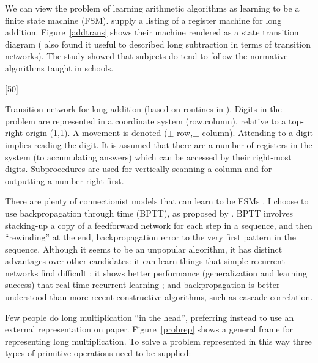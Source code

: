 
We can view the problem of learning arithmetic algorithms as
learning to be a finite state machine (FSM).
 supply a listing of a register machine for long addition.
Figure~\ref{addtrans} shows their machine rendered as a state transition
diagram (
also found it useful to described long subtraction
in terms of transition networks). The  study showed that
subjects do tend to follow the normative algorithms taught in schools.

\begin{fancyfigure}
[50]\vspace{2.1in}
\caption{Transition network for long addition (based on routines in
\protect{}).  Digits in the problem are represented in a
coordinate system (row,column), relative to a top-right origin (1,1).
A movement is denoted ($\pm$ row,$\pm$ column).
Attending to a digit implies reading the
digit. It is assumed that there are a number of registers in the
system (to accumulating answers) which can be accessed by their right-most
digits.  Subprocedures are used for
vertically scanning a column and for outputting
a number right-first.}
\label{addtrans}
\end{fancyfigure}

There are plenty of connectionist models that can learn to be FSMs
\cite{pdp:8,elmafind,servenco,cottlear,clues,willexpe,rcascor}. I
choose to use backpropagation through time (BPTT), as proposed by
.  BPTT involves stacking-up a copy of a
feedforward network for each step in a sequence, and then ``rewinding'' at
the end, backpropagation error to the very first pattern in the sequence.
Although it seems to be an unpopular algorithm, it has distinct advantages
over other candidates: it can learn things that simple recurrent networks
find difficult \cite{maskforc}; it shows better performance (generalization
and learning success) that real-time recurrent learning \cite{zipssubg};
and backpropagation is better understood than more recent constructive
algorithms, such as cascade correlation.


Few people do long multiplication ``in the head'', preferring instead to
use an external representation on paper.  Figure~\ref{probrep} shows a
general frame for representing long multiplication.  To solve a problem
represented in this way three types of primitive operations need to be
supplied:

